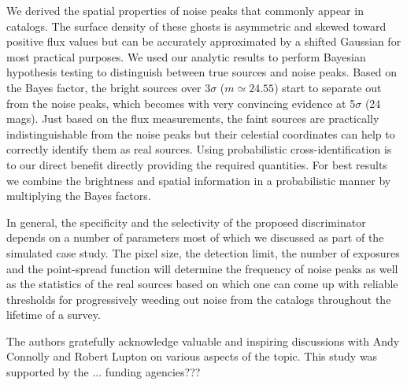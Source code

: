 \documentclass[twocolumn]{emulateapj}
\begin{document}
We derived the spatial properties of noise peaks that commonly appear in catalogs. The surface density of these ghosts is asymmetric and skewed toward positive flux values but can be accurately approximated by a shifted Gaussian for most practical purposes. We used our analytic results to perform Bayesian hypothesis testing to distinguish between true sources and noise peaks.
%
Based on the Bayes factor, the bright sources over \mbox{3$\sigma$} \mbox{($m\!\simeq\!24.55$)} start to separate out from the noise peaks, which becomes with very convincing evidence at \mbox{5$\sigma$} (24 mags).
%
Just based on the flux measurements, the faint sources are practically indistinguishable from the noise peaks but their celestial coordinates can help to correctly identify them as real sources. Using probabilistic cross-identification is to our direct benefit directly providing the required quantities. For best results we combine the brightness and spatial information in a probabilistic manner by multiplying the Bayes factors.

In general, the specificity and the selectivity of the proposed discriminator depends on a number of parameters most of which we discussed as part of the simulated case study. The pixel size, the detection limit, the number of exposures and the point-spread function will determine the frequency of noise peaks as well as the statistics of the real sources based on which one can come up with reliable thresholds for progressively weeding out noise from the catalogs throughout the lifetime of a survey.



\iffalse
\begin{figure}
\epsscale{1.2}
\plotone{fig/f9.png}
\caption{The Bayes factor increases for the simulate noise peaks as we increase their surface density. These simulations illustrate that effect for 1$\times$, 2$\times$, ..., and 5$\times$ the original density used in Figure~\ref{fig:bf2}. The highest density of about 3/$\square\arcsec$ corresponds roughly to 1 peak in 9 pixels for images with 0.5\arcsec pixels, which can be considered the absolute limit.}
\label{fig:bfx}
\end{figure}
\fi


\acknowledgements{}
The authors gratefully acknowledge valuable and inspiring discussions with Andy Connolly and Robert Lupton on various aspects of the topic. This study was supported by the ... {\color{red}funding agencies???}

\color{black}
\end{document}

